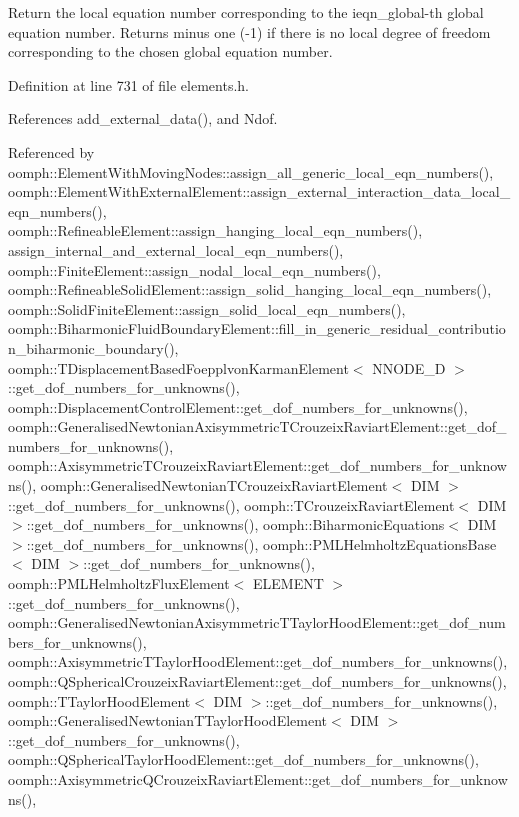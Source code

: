 Return the local equation number corresponding to the ieqn\+\_\+global-\/th global equation number. Returns minus one (-\/1) if there is no local degree of freedom corresponding to the chosen global equation number. 



Definition at line 731 of file elements.\+h.



References add\+\_\+external\+\_\+data(), and Ndof.



Referenced by oomph\+::\+Element\+With\+Moving\+Nodes\+::assign\+\_\+all\+\_\+generic\+\_\+local\+\_\+eqn\+\_\+numbers(), oomph\+::\+Element\+With\+External\+Element\+::assign\+\_\+external\+\_\+interaction\+\_\+data\+\_\+local\+\_\+eqn\+\_\+numbers(), oomph\+::\+Refineable\+Element\+::assign\+\_\+hanging\+\_\+local\+\_\+eqn\+\_\+numbers(), assign\+\_\+internal\+\_\+and\+\_\+external\+\_\+local\+\_\+eqn\+\_\+numbers(), oomph\+::\+Finite\+Element\+::assign\+\_\+nodal\+\_\+local\+\_\+eqn\+\_\+numbers(), oomph\+::\+Refineable\+Solid\+Element\+::assign\+\_\+solid\+\_\+hanging\+\_\+local\+\_\+eqn\+\_\+numbers(), oomph\+::\+Solid\+Finite\+Element\+::assign\+\_\+solid\+\_\+local\+\_\+eqn\+\_\+numbers(), oomph\+::\+Biharmonic\+Fluid\+Boundary\+Element\+::fill\+\_\+in\+\_\+generic\+\_\+residual\+\_\+contribution\+\_\+biharmonic\+\_\+boundary(), oomph\+::\+T\+Displacement\+Based\+Foepplvon\+Karman\+Element$<$ N\+N\+O\+D\+E\+\_\+D $>$\+::get\+\_\+dof\+\_\+numbers\+\_\+for\+\_\+unknowns(), oomph\+::\+Displacement\+Control\+Element\+::get\+\_\+dof\+\_\+numbers\+\_\+for\+\_\+unknowns(), oomph\+::\+Generalised\+Newtonian\+Axisymmetric\+T\+Crouzeix\+Raviart\+Element\+::get\+\_\+dof\+\_\+numbers\+\_\+for\+\_\+unknowns(), oomph\+::\+Axisymmetric\+T\+Crouzeix\+Raviart\+Element\+::get\+\_\+dof\+\_\+numbers\+\_\+for\+\_\+unknowns(), oomph\+::\+Generalised\+Newtonian\+T\+Crouzeix\+Raviart\+Element$<$ D\+I\+M $>$\+::get\+\_\+dof\+\_\+numbers\+\_\+for\+\_\+unknowns(), oomph\+::\+T\+Crouzeix\+Raviart\+Element$<$ D\+I\+M $>$\+::get\+\_\+dof\+\_\+numbers\+\_\+for\+\_\+unknowns(), oomph\+::\+Biharmonic\+Equations$<$ D\+I\+M $>$\+::get\+\_\+dof\+\_\+numbers\+\_\+for\+\_\+unknowns(), oomph\+::\+P\+M\+L\+Helmholtz\+Equations\+Base$<$ D\+I\+M $>$\+::get\+\_\+dof\+\_\+numbers\+\_\+for\+\_\+unknowns(), oomph\+::\+P\+M\+L\+Helmholtz\+Flux\+Element$<$ E\+L\+E\+M\+E\+N\+T $>$\+::get\+\_\+dof\+\_\+numbers\+\_\+for\+\_\+unknowns(), oomph\+::\+Generalised\+Newtonian\+Axisymmetric\+T\+Taylor\+Hood\+Element\+::get\+\_\+dof\+\_\+numbers\+\_\+for\+\_\+unknowns(), oomph\+::\+Axisymmetric\+T\+Taylor\+Hood\+Element\+::get\+\_\+dof\+\_\+numbers\+\_\+for\+\_\+unknowns(), oomph\+::\+Q\+Spherical\+Crouzeix\+Raviart\+Element\+::get\+\_\+dof\+\_\+numbers\+\_\+for\+\_\+unknowns(), oomph\+::\+T\+Taylor\+Hood\+Element$<$ D\+I\+M $>$\+::get\+\_\+dof\+\_\+numbers\+\_\+for\+\_\+unknowns(), oomph\+::\+Generalised\+Newtonian\+T\+Taylor\+Hood\+Element$<$ D\+I\+M $>$\+::get\+\_\+dof\+\_\+numbers\+\_\+for\+\_\+unknowns(), oomph\+::\+Q\+Spherical\+Taylor\+Hood\+Element\+::get\+\_\+dof\+\_\+numbers\+\_\+for\+\_\+unknowns(), oomph\+::\+Axisymmetric\+Q\+Crouzeix\+Raviart\+Element\+::get\+\_\+dof\+\_\+numbers\+\_\+for\+\_\+unknowns(), 
